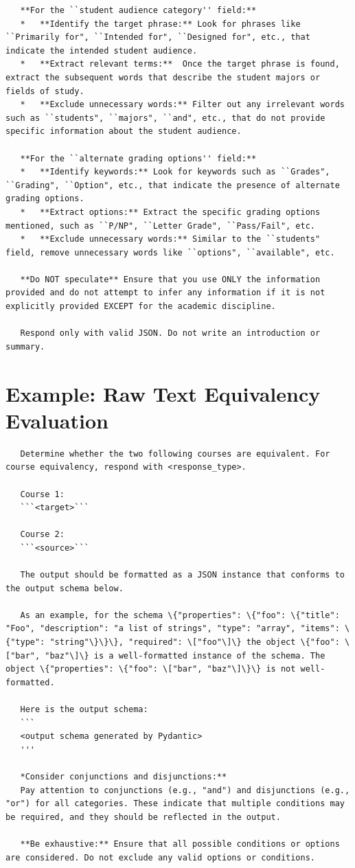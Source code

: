 \begin{lstlisting}
   **For the ``student audience category'' field:**
   *   **Identify the target phrase:** Look for phrases like ``Primarily for", ``Intended for", ``Designed for", etc., that indicate the intended student audience.
   *   **Extract relevant terms:**  Once the target phrase is found, extract the subsequent words that describe the student majors or fields of study.
   *   **Exclude unnecessary words:** Filter out any irrelevant words such as ``students", ``majors", ``and", etc., that do not provide specific information about the student audience.
   
   **For the ``alternate grading options'' field:**
   *   **Identify keywords:** Look for keywords such as ``Grades", ``Grading", ``Option", etc., that indicate the presence of alternate grading options.
   *   **Extract options:** Extract the specific grading options mentioned, such as ``P/NP", ``Letter Grade", ``Pass/Fail", etc.
   *   **Exclude unnecessary words:** Similar to the ``students" field, remove unnecessary words like ``options", ``available", etc.
   
   **Do NOT speculate** Ensure that you use ONLY the information provided and do not attempt to infer any information if it is not explicitly provided EXCEPT for the academic discipline.

   Respond only with valid JSON. Do not write an introduction or summary.
\end{lstlisting}

\section{Example: Raw Text Equivalency Evaluation}\label{app:rawequivprompt}

\begin{lstlisting}
   Determine whether the two following courses are equivalent. For course equivalency, respond with <response_type>.

   Course 1:
   ```<target>```

   Course 2:
   ```<source>```

   The output should be formatted as a JSON instance that conforms to the output schema below.

   As an example, for the schema \{"properties": \{"foo": \{"title": "Foo", "description": "a list of strings", "type": "array", "items": \{"type": "string"\}\}\}, "required": \["foo"\]\} the object \{"foo": \["bar", "baz"\]\} is a well-formatted instance of the schema. The object \{"properties": \{"foo": \["bar", "baz"\]\}\} is not well-formatted.

   Here is the output schema:
   ```
   <output schema generated by Pydantic>
   '''

   *Consider conjunctions and disjunctions:**
   Pay attention to conjunctions (e.g., "and") and disjunctions (e.g., "or") for all categories. These indicate that multiple conditions may be required, and they should be reflected in the output.

   **Be exhaustive:** Ensure that all possible conditions or options are considered. Do not exclude any valid options or conditions.
\end{lstlisting}

